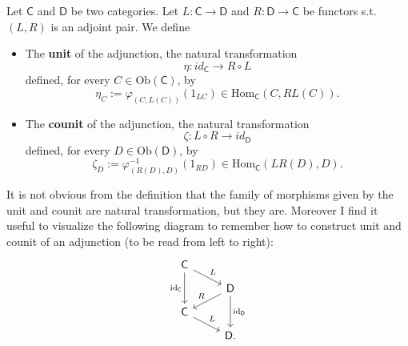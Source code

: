 \begin{defn}
	Let $\mathsf{C}$ and $\mathsf{D}$ be two categories.
	Let $L: \mathsf{C} \to \mathsf{D}$ and $R: \mathsf{D} \to \mathsf{C}$ be functors
	s.t. $\left(L, R\right)$ is an adjoint pair.
	We define
	\begin{itemize}
		\item The \textbf{unit} of the adjunction, the natural transformation
			\begin{equation}
			\eta: id_{\mathsf{C}} \to R \circ L
			\end{equation} 
			defined, for every $C \in \mathrm{Ob} \left(\mathsf{C}\right)$, by
			\begin{equation}
				\eta_C := \varphi_{(C, L(C))} \left( 1_{LC} \right) \in \mathrm{Hom}_{\mathsf{C}} \left( C, RL(C) \right)
			.\end{equation} 
		\item The \textbf{counit} of the adjunction, the natural transformation
			\begin{equation}
			\zeta: L \circ R \to id_{\mathsf{D}}
			\end{equation} 
			defined, for every $D \in \mathrm{Ob} \left(\mathsf{D}\right)$, by
			\begin{equation}
				\zeta_D := \varphi_{(R(D), D)}^{-1} \left( 1_{RD} \right) \in \mathrm{Hom}_{\mathsf{C}} \left( LR(D), D \right)
			.\end{equation} 
	\end{itemize}
\end{defn}

\begin{rem}[]
	It is not obvious from the definition that the family of morphisms given by the unit and counit
	are natural transformation, but they are.
	Moreover I find it useful to visualize the following diagram to remember how to construct
	unit and counit of an adjunction (to be read from left to right):
	\begin{equation}
	\begin{tikzcd}[row sep=0.7em]
		\mathsf{C} \arrow[rd, "L", rightarrow] 
		\arrow[dd, "\mathrm{id}_{ \mathsf{C} }"', rightarrow] 
		& \\
		& \mathsf{D} 
		\arrow[dd, "\mathrm{id}_{ \mathsf{D} }", rightarrow] 
		\arrow[ld, "R"', rightarrow] \\
		\mathsf{C} \arrow[rd, "L", rightarrow] 
		& \\
		& \mathsf{D}
	.\end{tikzcd}
	\end{equation}
\end{rem}

